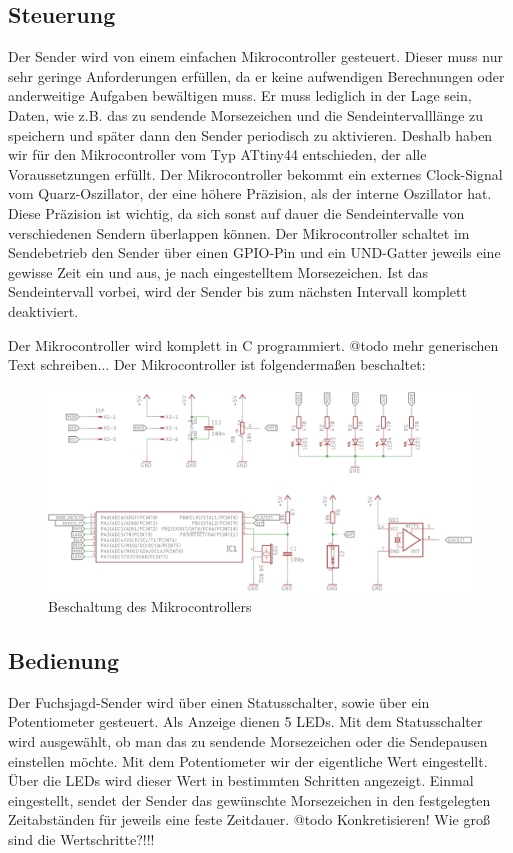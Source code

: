 \subsection{Steuerung}
Der Sender wird von einem einfachen Mikrocontroller gesteuert. Dieser muss nur
sehr geringe Anforderungen erfüllen, da er keine aufwendigen Berechnungen oder anderweitige
Aufgaben bewältigen muss. Er muss lediglich in der Lage sein, Daten, wie z.B. das
zu sendende Morsezeichen und die Sendeintervalllänge zu speichern und später dann
den Sender periodisch zu aktivieren. Deshalb haben wir für den Mikrocontroller vom
Typ ATtiny44 entschieden, der alle Voraussetzungen erfüllt. Der Mikrocontroller bekommt
ein externes Clock-Signal vom Quarz-Oszillator, der eine höhere Präzision, als der interne
Oszillator hat. Diese Präzision ist wichtig, da sich sonst auf dauer die Sendeintervalle von
verschiedenen Sendern überlappen können. Der Mikrocontroller schaltet im Sendebetrieb den Sender
über einen GPIO-Pin und ein UND-Gatter jeweils eine gewisse Zeit ein und aus, je nach eingestelltem
Morsezeichen. Ist das Sendeintervall vorbei, wird der Sender bis zum nächsten Intervall komplett
deaktiviert.

Der Mikrocontroller wird komplett in C programmiert.
@todo mehr generischen Text schreiben...
Der Mikrocontroller ist folgendermaßen beschaltet:

\begin{figure}[H]
\includegraphics[scale=0.9]{res/Controller.png}
\caption{Beschaltung des Mikrocontrollers}
\end{figure}

\subsection{Bedienung}
Der Fuchsjagd-Sender wird über einen Statusschalter, sowie über ein Potentiometer
gesteuert. Als Anzeige dienen 5 LEDs. Mit dem Statusschalter wird ausgewählt, ob
man das zu sendende Morsezeichen oder die Sendepausen einstellen möchte.
Mit dem Potentiometer wir der eigentliche Wert eingestellt. Über die LEDs wird dieser
Wert in bestimmten Schritten angezeigt. Einmal eingestellt, sendet der Sender das gewünschte
Morsezeichen in den festgelegten Zeitabständen für jeweils eine feste Zeitdauer.
@todo Konkretisieren! Wie groß sind die Wertschritte?!!!
